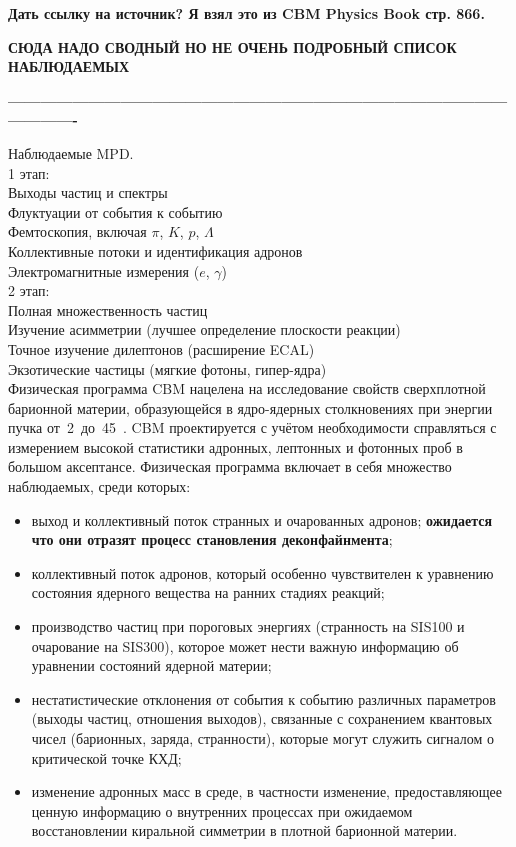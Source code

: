 \todo \textbf{Дать ссылку на источник? Я взял это из CBM Physics Book стр. 866.}




\textbf{СЮДА НАДО СВОДНЫЙ НО НЕ ОЧЕНЬ ПОДРОБНЫЙ СПИСОК НАБЛЮДАЕМЫХ}

\textbf{----------------------------------------------------------------------------------------------------------}

Наблюдаемые MPD. \\
1 этап: \\
Выходы частиц и спектры \\
Флуктуации от события к событию \\
Фемтоскопия, включая $\pi$, $K$, $p$, $\Lambda$ \\
Коллективные потоки и идентификация адронов \\
Электромагнитные измерения ($e$, $\gamma$) \\

2 этап: \\
Полная множественность частиц \\
Изучение асимметрии (лучшее определение плоскости реакции) \\
Точное изучение дилептонов (расширение ECAL) \\
Экзотические частицы (мягкие фотоны, гипер-ядра) \\


Физическая программа CBM нацелена на исследование свойств сверхплотной барионной материи, образующейся в ядро-ядерных столкновениях при энергии пучка от~2~до~45~\GeVperNucl. CBM проектируется с учётом необходимости справляться с измерением высокой статистики адронных, лептонных и фотонных проб в большом аксептансе. Физическая программа включает в себя множество наблюдаемых, среди которых:

\begin{itemize}
\item выход и коллективный поток странных и очарованных адронов; \todo \textbf{ожидается что они отразят процесс становления деконфайнмента};
\item коллективный поток адронов, который особенно чувствителен к уравнению состояния ядерного вещества на ранних стадиях реакций;
\item производство частиц при пороговых энергиях (странность на SIS100 и очарование на SIS300), которое может нести важную информацию об уравнении состояний ядерной материи;
\item нестатистические отклонения от события к событию различных параметров (выходы частиц, отношения выходов), связанные с сохранением квантовых чисел (барионных, заряда, странности), которые могут служить сигналом о критической точке КХД;
\item изменение адронных масс в среде, в частности изменение, предоставляющее ценную информацию о внутренних процессах при ожидаемом восстановлении киральной симметрии в плотной барионной материи.
\end{itemize}

